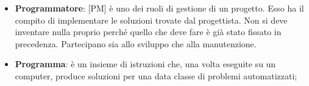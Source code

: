\begin{itemize}
	\item \textbf{Programmatore}: [PM] è uno dei ruoli di gestione di un progetto. 	\newline
Esso ha il compito di implementare le soluzioni trovate dal progettista. Non si deve inventare nulla proprio perché quello che deve fare è già stato fissato in precedenza. Partecipano sia allo sviluppo che alla manutenzione.

	\item \textbf{Programma}: è un insieme di istruzioni che, una volta eseguite su un computer, produce soluzioni per una data classe di problemi automatizzati;

\end{itemize}